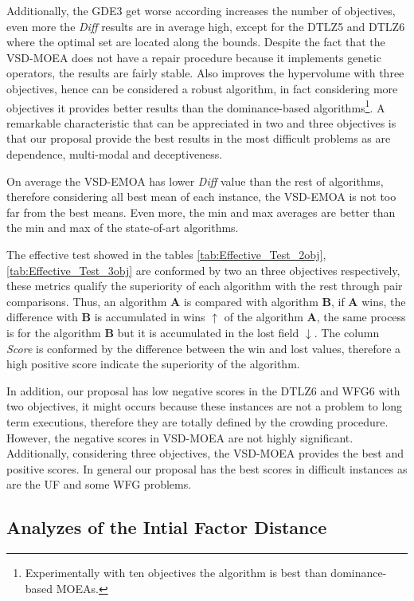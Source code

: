 %
Additionally, the GDE3 get worse according increases the number of objectives, even more the \textit{Diff} results are in average high, except for the DTLZ5 and DTLZ6 where the optimal set are located along the bounds.
%
Despite the fact that the VSD-MOEA does not have a repair procedure because it implements genetic operators, the results are fairly stable.
%
Also improves the hypervolume with three objectives, hence can be considered a robust algorithm, in fact considering more objectives it provides better results than the dominance-based algorithms\footnote{Experimentally with ten objectives the algorithm is best than dominance-based MOEAs.}.
%
A remarkable characteristic that can be appreciated in two and three objectives is that our  proposal provide the best results in the most difficult problems as are dependence, multi-modal and deceptiveness.

%
On average the VSD-EMOA has lower \textit{Diff} value than the rest of algorithms, therefore considering all best mean of each instance, the VSD-EMOA is not too far from the best means.
%
Even more, the min and max averages are better than the min and max of the state-of-art algorithms.
%

The effective test showed in the tables \ref{tab:Effective_Test_2obj}, \ref{tab:Effective_Test_3obj} are conformed by two an three objectives respectively,  these metrics qualify the superiority of each algorithm with the rest through pair comparisons.
%
Thus, an algorithm \textbf{A} is compared with algorithm \textbf{B}, if \textbf{A} wins, the difference with \textbf{B} is accumulated in wins $\uparrow$ of the algorithm \textbf{A}, the same process is for the algorithm \textbf{B} but it is accumulated in the lost field $\downarrow$.
%
The column \textit{Score} is conformed by the difference between the win and lost values, therefore a high positive score indicate the superiority of the algorithm.
%

In addition, our proposal has low negative scores in the DTLZ6 and WFG6 with two objectives, it might occurs because these instances are not a problem to long term executions, therefore they are totally defined by the crowding procedure.
%
However, the negative scores in VSD-MOEA are not highly significant.
%
Additionally, considering three objectives, the VSD-MOEA provides the best and positive scores.
%
In general our proposal has the best scores in difficult instances as are the UF and some WFG problems.


\subsection{Analyzes of the Intial Factor Distance}

